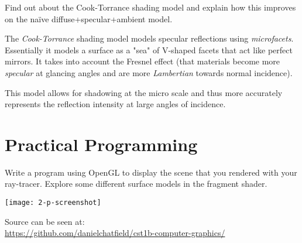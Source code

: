 \documentclass{supervision}
\begin{document}
\begin{questions}
    \question
    Find out about the Cook-Torrance shading model and explain how this improves on the naïve diffuse+specular+ambient model.
    \begin{solution}
    The \textit{Cook-Torrance} shading model models specular reflections using \textit{microfacets}. Essentially it models a surface as a "sea" of V-shaped facets that act like perfect mirrors. It takes into account the Fresnel effect (that materials become more \textit{specular} at glancing angles and are more \textit{Lambertian} towards normal incidence).
    
    This model allows for shadowing at the micro scale and thus more accurately represents the reflection intensity at large angles of incidence.
    \end{solution}


\end{questions}

\section*{Practical Programming}
\begin{questions}
    \question
    Write a program using OpenGL to display the scene that you rendered with your ray-tracer. Explore some different surface models in the fragment shader.
    \begin{solution}
    \begin{center}
        \texttt{[image: 2-p-screenshot]}
    \end{center}
    Source can be seen at: \\
    \url{https://github.com/danielchatfield/cst1b-computer-graphics/}
    \end{solution}

\end{questions}
\end{document}
